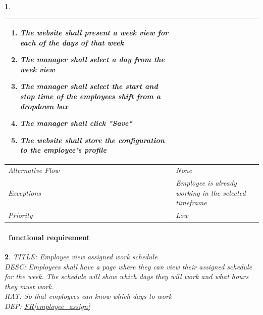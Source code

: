 \documentclass{scrreprt}
\theoremstyle{funreq}
\newtheorem{funreq}{}
\newcommand*{\reqref}[1]{\hyperref[#1]{FR\ref*{#1}}}
\begin{document}
\begin{funreq}
\begin{table}[H]
{\begin{tabularx}{\columnwidth}{|l|X|}
\begin{enumerate}
    					\item The website shall present a week view for each of the days of that week
    					\item The manager shall select a day from the week view
    					\item The manager shall select the start and stop time of the employees shift from a dropdown box
    					\item The manager shall click "Save"
    					\item The website shall store the configuration to the employee's profile
					\end{enumerate}
					\\ \hline Alternative Flow & 
					None
					\\ \hline Exceptions & 
					Employee is already working in the selected timeframe
					\\ \hline Priority & 
					Low
					\\ \hline
				\end{tabularx}%
			}
		\end{table}
	\end{funreq}
	
	\paragraph[]{\Subsectionname ~functional requirement }
	\begin{funreq}
		\label{employee_viewwork}
		TITLE: Employee view assigned work schedule\\
		DESC: Employees shall have a page where they can view their assigned schedule for the week.  The schedule will show which days they will work and what hours they must work.\\
		RAT: So that employees can know which days to work\\
		DEP: \reqref{employee_assign}
	\end{funreq}
	
\end{document}
